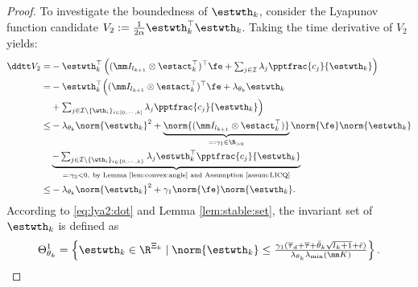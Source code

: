 \documentclass[lettersize,journal]{IEEEtran}
\begin{document}
\begin{proof}
To investigate the boundedness of $\estwth_k$, consider the Lyapunov function candidate $V_2:=\tfrac{1}{2\alpha}\estwth_k^\top \estwth_k$.
Taking the time derivative of $V_2$ yields:
\begin{equation}
    \begin{aligned}
        \ddtt  V_2 
        =& 
        -\estwth_k^\top 
        \left(
            (\mm I_{l_{k+1}}\otimes \estact_k^\top)^\top
            \fe
            +
            \textstyle\sum_{j\in\mathcal{I}}
            \lambda_j 
            \pptfrac{c_j}{\estwth_k}
        \right)
        \\
        =&
        -\estwth_k^\top 
        \Big(
            (\mm I_{l_{k+1}}\otimes \estact_k^\top)^\top
            \fe
            +
            \lambda_{\theta_k}\estwth_k
        \\
        &
            +
            \textstyle\sum_{
                j\in\mathcal{I}\setminus \{\wth_i\}_{i\in[0,\cdots,k]}
            }
            \lambda_j 
            \pptfrac{c_j}{\estwth_k}
        \Big)
        \\
        \le&
        -
        \lambda_{\theta_k}\norm{\estwth_k}^2
        +
        \underbrace{
            \norm{(\mm I_{l_{k+1}}\otimes {\estact}_k^\top)}
        }_{=:{\gamma}_1\in\R_{>0}}
        \norm{\fe}
        \norm{\estwth_k}
        \\
        &
        \underbrace{
            -
            \textstyle\sum_{
                j\in\mathcal{I}\setminus \{\wth_i\}_{i\in\{0,\cdots,k\}}
            }
            \lambda_j 
            \estwth_k^\top \pptfrac{c_j}{\estwth_k}
        }_{=:{\gamma}_2<0,\ \text{by Lemma \ref{lem:convex:angle} and Assumption \ref{assum:LICQ}}}
        \\
        \le&
        -
        \lambda_{\theta_k}\norm{\estwth_k}^2
        +
        {\gamma}_1     
        \norm{\fe}
        \norm{\estwth_k}
        .
    \end{aligned}
    \label{eq:lya2:dot}
\end{equation}
According to \eqref{eq:lya2:dot} and Lemma \ref{lem:stable:set}, the invariant set of $\estwth_k$ is defined as
\begin{equation}
    \Theta_{\theta_k}^{1} 
    = 
    \left\{ 
        \estwth_k \in \R^{\Xi_{k}} 
        \mid 
        \norm{\estwth_k} 
        \le 
        \tfrac{
            {\gamma}_1
            (
                \overline\tau_d
                +
                \overline\tau
                +
                \bar{\theta}_k\sqrt{l_{k}+1}
                +
                \bar{\epsilon}
            )
        }{
            \lambda_{\theta_k}\lambda_{\min}(\mm K)
        }
    \right\}
    .
    \label{eq:invariant:c1:wth}
\end{equation}


\end{proof}
\end{document}
